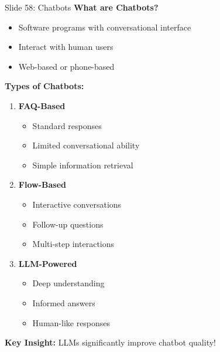 \documentclass[8pt]{beamer}
\begin{document}
	\begin{frame}{Slide 58: Chatbots}
		\fontsize{6.5}{7.5}\selectfont
		\textbf{What are Chatbots?}
		\begin{itemize}
			\item Software programs with conversational interface
			\item Interact with human users
			\item Web-based or phone-based
		\end{itemize}
		
		\vspace{0.1cm}
		\textbf{Types of Chatbots:}
		\begin{enumerate}
			\item \textbf{FAQ-Based}
			\begin{itemize}
				\item Standard responses
				\item Limited conversational ability
				\item Simple information retrieval
			\end{itemize}
			\item \textbf{Flow-Based}
			\begin{itemize}
				\item Interactive conversations
				\item Follow-up questions
				\item Multi-step interactions
			\end{itemize}
			\item \textbf{LLM-Powered}
			\begin{itemize}
				\item Deep understanding
				\item Informed answers
				\item Human-like responses
			\end{itemize}
		\end{enumerate}
		
		\textcolor{myblue}{\textbf{Key Insight:}} LLMs significantly improve chatbot quality!
	\end{frame}
	
\end{document}
